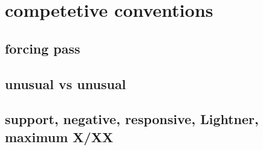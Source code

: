 \section{competetive conventions}

\subsection{forcing pass}


\subsection{unusual vs unusual}

\subsection{support, negative, responsive, Lightner, maximum X/XX}